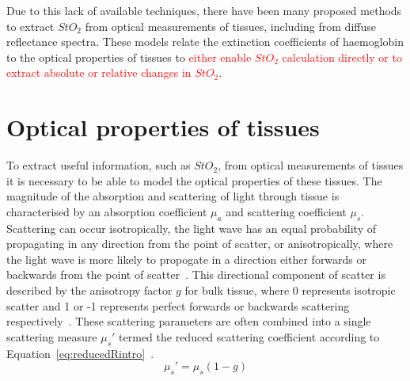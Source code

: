 Due to this lack of available techniques, there have been many proposed methods to extract $StO_2$ from optical measurements of tissues, including from diffuse reflectance spectra. These models relate the extinction coefficients of haemoglobin to the optical properties of tissues to \textcolor{red}{either enable $StO_2$ calculation directly or to extract absolute or relative changes in $StO_2$}. 

\section{Optical properties of tissues}\label{sec:introoptics}
To extract useful information, such as $StO_2$, from optical measurements of tissues it is necessary to be able to model the optical properties of these tissues. The magnitude of the absorption and scattering of light through tissue is characterised by an absorption coefficient $\mu_a$ and scattering coefficient $\mu_s$. Scattering can occur isotropically, the light wave has an equal probability of propagating in any direction from the point of scatter, or anisotropically, where the light wave is more likely to propogate in a direction either forwards or backwards from the point of scatter~\citep{Jacques2013}. This directional component of scatter is described by the anisotropy factor $g$ for bulk tissue, where 0 represents isotropic scatter and 1 or -1 represents perfect forwards or backwards scattering respectively~\citep{Jacques2013}. These scattering parameters are often combined into a single scattering measure $\mu_s'$ termed the reduced scattering coefficient according to Equation~\eqref{eq:reducedRintro}~\citep{Jacques2013}. 
\begin{equation}
    \mu_s' = \mu_s(1-g)
    \label{eq:reducedRintro}
\end{equation}

